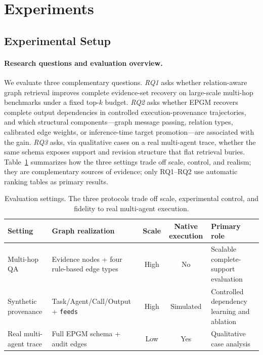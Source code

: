 \section{Experiments}
\label{sec:experiments}

\subsection{Experimental Setup}

\paragraph{Research questions and evaluation overview.}
We evaluate three complementary questions. \emph{RQ1} asks whether
relation-aware graph retrieval improves complete evidence-set recovery
on large-scale multi-hop benchmarks under a fixed top-$k$ budget.
\emph{RQ2} asks whether EPGM recovers complete output dependencies in
controlled execution-provenance trajectories, and which structural
components---graph message passing, relation types, calibrated edge
weights, or inference-time target
promotion---are associated with the gain. \emph{RQ3} asks, via qualitative cases on a real multi-agent trace,
whether the same schema exposes support and revision structure that flat
retrieval buries. Table~\ref{tab:eval-overview} summarizes
how the three settings trade off scale, control, and realism; they are
complementary sources of evidence; only RQ1--RQ2 use automatic ranking
tables as primary results.

\begin{table}[t]
\centering
\small
\caption{Evaluation settings. The three protocols trade off scale,
experimental control, and fidelity to real multi-agent execution.}
\label{tab:eval-overview}
\begin{tabular}{lp{3.2cm}ccp{4.2cm}}
\hline
Setting & Graph realization & Scale & Native execution & Primary role \\
\hline
Multi-hop QA & Evidence nodes + four rule-based edge types & High & No &
Scalable complete-support evaluation \\
Synthetic provenance & Task/Agent/Call/Output + \texttt{feeds} & High & Simulated &
Controlled dependency learning and ablation \\
Real multi-agent trace & Full EPGM schema + audit edges & Low & Yes &
Qualitative case analysis \\
\hline
\end{tabular}
\end{table}

